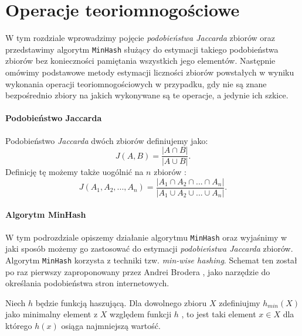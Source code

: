 \chapter{Operacje teoriomnogościowe}
\thispagestyle{chapterBeginStyle}

W tym rozdziale wprowadzimy pojęcie \textit{podobieństwa Jaccarda} zbiorów oraz przedstawimy algorytm \texttt{MinHash} służący do estymacji takiego podobieństwa zbiorów bez konieczności pamiętania wszystkich jego elementów.
 Następnie omówimy podstawowe metody estymacji liczności zbiorów powstałych w wyniku wykonania operacji teoriomnogościowych w przypadku, gdy nie są znane bezpośrednio zbiory na jakich wykonywane są te operacje, a jedynie ich szkice. 

\subsubsection{Podobieństwo Jaccarda}
Podobieństwo \textit{Jaccarda} dwóch zbiorów definiujemy jako:
\begin{equation}
    J(A, B) = \frac{|A \cap B|}{|A \cup B|}.
\end{equation}
Definicję tę możemy także uogólnić  na $n$ zbiorów \cite{adroll}:
\begin{equation}
    J(A_1, A_2, ..., A_n) = \frac{|A_1 \cap A_2 \cap ... \cap A_n|}{|A_1 \cup A_2 \cup ... \cup A_n|}.
    \label{jacc_multi}
\end{equation}

\subsubsection{Algorytm MinHash}
\label{minhash}
W tym podrozdziale opiszemy działanie algorytmu \texttt{MinHash} oraz wyjaśnimy w jaki sposób możemy go zastosować do estymacji \textit{podobieństwa Jaccarda} zbiorów.
Algorytm \texttt{MinHash} korzysta z techniki tzw. \textit{min-wise hashing}. Schemat ten został po raz pierwszy zaproponowany przez Andrei Brodera \cite{broder}, jako narzędzie do określania podobieństwa stron internetowych.

Niech $h$ będzie funkcją haszującą.
 Dla dowolnego zbioru $X$ zdefiniujmy $h_{min}(X)$ jako minimalny element z $X$ względem funkcji $h$ , to jest taki element $x \in X$ dla którego $h(x)$ osiąga najmniejszą wartość.

